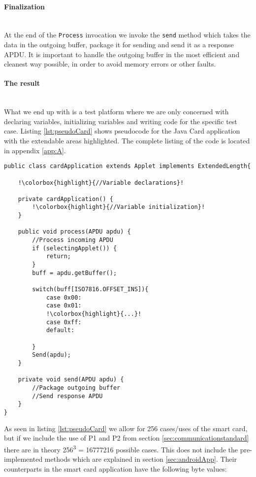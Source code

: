 \paragraph{Finalization}\mbox{}\\
At the end of the \texttt{Process} invocation we invoke the \texttt{send} method which takes the data in the outgoing buffer, package it for sending and send it as a response APDU. It is important to handle the outgoing buffer in the most efficient and cleanest way possible, in order to avoid memory errors or other faults.

\paragraph{The result}\mbox{}\\
What we end up with is a test platform where we are only concerned with declaring variables, initializing variables and writing code for the specific test case. Listing \ref{lst:pseudoCard} shows pseudocode for the Java Card application with the extendable areas highlighted. The complete listing of the code is located in appendix \ref{app:A}.

\newpage
\begin{lstlisting}[caption=Pseudo code for javacard test application., label=lst:pseudoCard,escapechar=!]
public class cardApplication extends Applet implements ExtendedLength{

    !\colorbox{highlight}{//Variable declarations}!

    private cardApplication() {
    	!\colorbox{highlight}{//Variable initialization}!
    }

    public void process(APDU apdu) {
    	//Process incoming APDU
        if (selectingApplet()) {
			return;
		}
        buff = apdu.getBuffer();

    	switch(buff[ISO7816.OFFSET_INS]){
            case 0x00:
            case 0x01:
            !\colorbox{highlight}{...}!
            case 0xff:
            default:

    	}
    	Send(apdu);
    }

    private void send(APDU apdu) {
    	//Package outgoing buffer
    	//Send response APDU
    }
}
\end{lstlisting}

As seen in listing \ref{lst:pseudoCard} we allow for 256 cases/uses of the smart card, but if we include the use of P1 and P2 from section \ref{sec:communicationstandard} there are in theory 256\textsuperscript{3} = 16777216 possible cases. This does not include the pre-implemented methods which are explained in section \ref{sec:androidApp}. Their counterparts in the smart card application have the following byte values:

